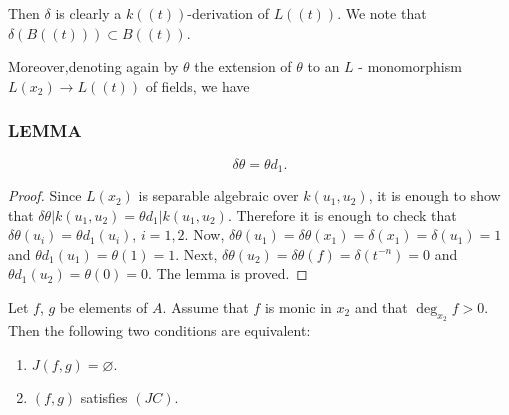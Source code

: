 Then $\delta$ is clearly a $k((t))$-derivation of $L((t))$. We note
that $\delta (B((t))) \subset B((t))$.

Moreover,\pageoriginale denoting again by $\theta$ the extension of
$\theta$ to an $L$ - monomorphism $L(x_2) \to L((t))$ of fields, we have

\setcounter{mysubsection}{3}
\subsubsection{LEMMA}\label{part2:chap6:sec20:sss20.3.1}
$$
\delta \theta = \theta d_1.
$$

\begin{proof}
  Since $L(x_2)$ is separable algebraic over $k(u_1, u_2)$, it is
  enough to show that $\delta \theta | k(u_1, u_2)= \theta d_1| k(u_1,
  u_2)$. Therefore it is enough to check that $\delta \theta (u_i) =
  \theta d_1 (u_i)$, $i= 1, 2$. Now, $\delta \theta (u_1)= \delta
  \theta (x_1)= \delta (x_1)= \delta(u_1)=1$ and $\theta d_1 (u_1)=
  \theta (1) =1$. Next, $\delta \theta (u_2)= \delta \theta(f)= \delta
  (t^{-n})=0$ and $\theta d_1 (u_2) = \theta (0) =0$. The lemma is proved.
\end{proof}

\setcounter{thm}{3}
\begin{thm}\label{part2:chap6:sec20:thm20.4}
  Let $f$, $g$ be elements of $A$. Assume that $f$ is monic in $x_2$
  and that $\deg_{x_2} f> 0$. Then the following two conditions are
  equivalent:
\begin{enumerate}[\rm (i)]
\item $J(f, g)=\diameter$.
\item $(f, g)$ satisfies $(JC)$.
\end{enumerate}
\end{thm}

